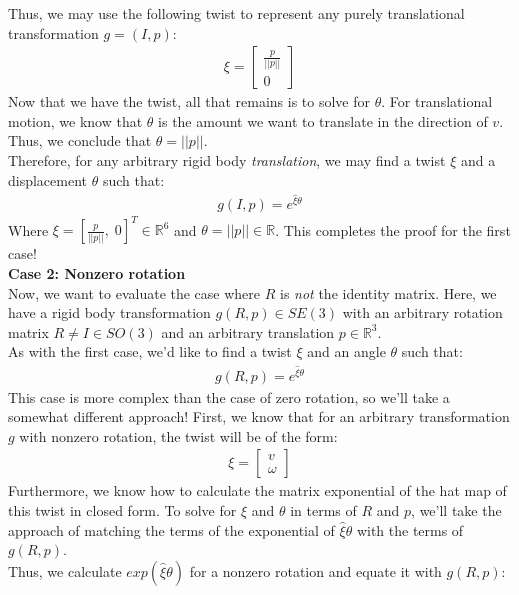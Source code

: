 \documentclass[oneside]{book}
\begin{document}
Thus, we may use the following twist to represent any purely translational transformation $g = (I, p)$:
\begin{align}
    \xi = 
    \begin{bmatrix}
        \frac{p}{||p||}\\
        0
    \end{bmatrix}
\end{align}
Now that we have the twist, all that remains is to solve for $\theta$. For translational motion, we know that $\theta$ is the amount we want to translate in the direction of $v$. Thus, we conclude that $\theta = ||p||$.\\
Therefore, for any arbitrary rigid body \textit{translation}, we may find a twist $\xi$ and a displacement $\theta$ such that:
\begin{align}
    g(I, p) = e^{\hat\xi\theta}
\end{align}
Where $\xi = [\frac{p}{||p||}, \; 0]^T \in \mathbb{R}^6$ and $\theta = ||p|| \in \mathbb{R}$. This completes the proof for the first case!\\
\textbf{Case 2: Nonzero rotation}\\
Now, we want to evaluate the case where $R$ is \textit{not} the identity matrix. Here, we have a rigid body transformation $g(R, p) \in SE(3)$ with an arbitrary rotation matrix $R\neq I \in SO(3)$ and an arbitrary translation $p \in \mathbb{R}^3$.\\
As with the first case, we'd like to find a twist $\xi$ and an angle $\theta$ such that:
\begin{align}
    g(R, p) = e^{\hat\xi\theta}
\end{align}
This case is more complex than the case of zero rotation, so we'll take a somewhat different approach! First, we know that for an arbitrary transformation $g$ with nonzero rotation, the twist will be of the form:
\begin{align}
    \xi = 
    \begin{bmatrix}
        v\\
        \omega
    \end{bmatrix}
\end{align}
Furthermore, we know how to calculate the matrix exponential of the hat map of this twist in closed form. To solve for $\xi$ and $\theta$ in terms of $R$ and $p$, we'll take the approach of matching the terms of the exponential of $\hat\xi\theta$ with the terms of $g(R, p)$.\\
Thus, we calculate $exp(\hat\xi\theta)$ for a nonzero rotation and equate it with $g(R, p)$:
\end{document}
